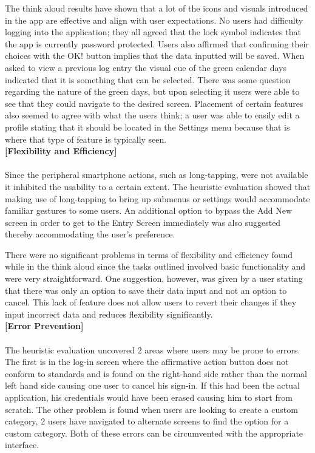 \documentclass[pdftex,12pt,a4paper]{report}
\begin{document}
The think aloud results have shown that a lot of the icons and visuals introduced in the app are effective and align with user expectations. No users had difficulty logging into the application; they all agreed that the lock symbol indicates that the app is currently password protected. Users also affirmed that confirming their choices with the OK! button implies that the data inputted will be saved. When asked to view a previous log entry the visual cue of the green calendar days indicated that it is something that can be selected. There was some question regarding the nature of the green days, but upon selecting it users were able to see that they could navigate to the desired screen. Placement of certain features also seemed to agree with what the users think; a user was able to easily edit a profile stating that it should be located in the Settings menu because that is where that type of feature is typically seen.\\

\pagebreak
\noindent\textbf{[Flexibility and Efficiency]}\\\\
Since the peripheral smartphone actions, such as long-tapping, were not available it inhibited the usability to a certain extent. The heuristic evaluation showed that making use of long-tapping to bring up submenus or settings would accommodate familiar gestures to some users. An additional option to bypass the Add New screen in order to get to the Entry Screen immediately was also suggested thereby accommodating the user's preference.

There were no significant problems in terms of flexibility and efficiency found while in the think aloud since the tasks outlined involved basic functionality and were very straightforward. One suggestion, however, was given by a user stating that there was only an option to save their data input and not an option to cancel. This lack of feature does not allow users to revert their changes if they input incorrect data and reduces flexibility significantly.\\

\noindent\textbf{[Error Prevention]}\\\\
The heuristic evaluation uncovered 2 areas where users may be prone to errors. The first is in the log-in screen where the affirmative action button does not conform to standards and is found on the right-hand side rather than the normal left hand side causing one user to cancel his sign-in. If this had been the actual application, his credentials would have been erased causing him to start from scratch. The other problem is found when users are looking to create a custom category, 2 users have navigated to alternate screens to find the option for a custom category. Both of these errors can be circumvented with the appropriate interface.\\
\end{document}
